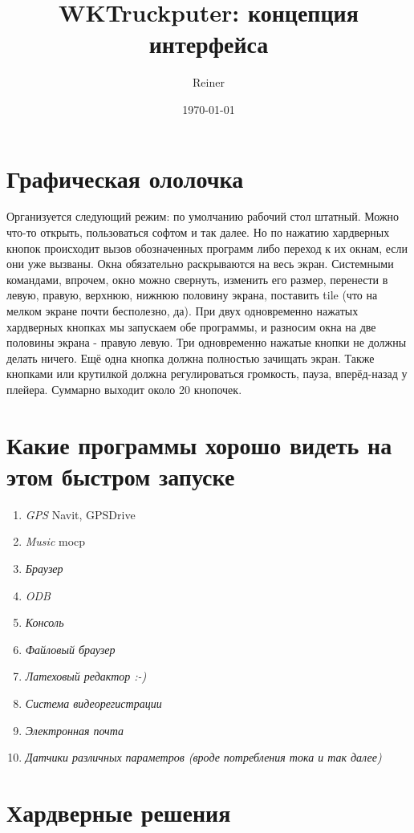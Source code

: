 \documentclass[12pt]{article}
\begin{document}
\title{WKTruckputer: концепция интерфейса}
\author{Reiner}
\date{\today}
\maketitle
{}


	\section {Графическая ололочка}
		Организуется следующий режим: по умолчанию рабочий стол штатный. Можно что-то открыть, пользоваться софтом и так далее. Но по нажатию хардверных кнопок происходит вызов обозначенных программ либо переход к их окнам, если они уже вызваны. Окна обязательно раскрываются на весь экран. Системными командами, впрочем, окно можно свернуть, изменить его размер, перенести в левую, правую, верхнюю, нижнюю половину экрана, поставить tile (что на мелком экране почти бесполезно, да).  При двух одновременно нажатых хардверных кнопках мы запускаем обе программы, и разносим окна на две половины экрана - правую левую. Три одновременно нажатые кнопки не должны делать ничего. Ещё одна кнопка должна полностью зачищать экран. Также кнопками или крутилкой должна регулироваться громкость, пауза, вперёд-назад у плейера. Суммарно выходит около 20 кнопочек. 
	\section {Какие программы хорошо видеть на этом быстром запуске }
		\begin {enumerate}
		
		\item \emph{GPS} Navit, GPSDrive
		\item \emph{Music} mocp 
		\item \emph{Браузер}
		\item \emph{ODB}
		\item \emph{Консоль}
		\item \emph{Файловый браузер}
		\item \emph{Латеховый редактор :-) }
		\item \emph{Система видеорегистрации }
		\item \emph{Электронная почта}
		\item \emph{Датчики различных параметров (вроде потребления тока и так далее)}
		\end {enumerate}
		
	\section{Хардверные решения }
\end{document}
